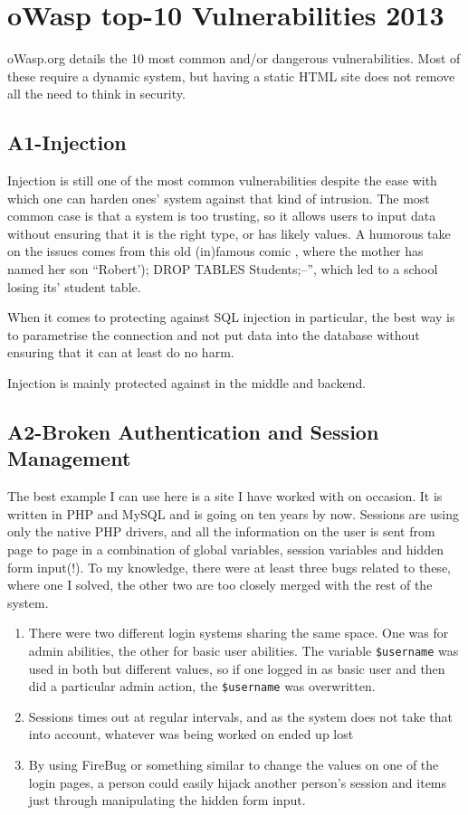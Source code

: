 \section{oWasp top-10 Vulnerabilities 2013}
\label{sec:owasp2013}
\noindent
oWasp.org \citep{oWasp2013t10} details the 10 most common and/or dangerous vulnerabilities. Most of these require a dynamic system, but having a static HTML site does not remove all the need to think in security.

\subsection{A1-Injection}
\noindent
Injection is still one of the most common vulnerabilities despite the ease with which one can harden ones' system against that kind of intrusion. The most common case is that a system is too trusting, so it allows users to input data without ensuring that it is the right type, or has likely values. A humorous take on the issues comes from this old (in)famous comic \citep{XKCDBobbyTables}, where the mother has named her son ``Robert'); DROP TABLES Students;--'', which led to a school losing its' student table.

When it comes to protecting against SQL injection in particular, the best way is to parametrise the connection and not put data into the database without ensuring that it can at least do no harm.

Injection is mainly protected against in the middle and backend.

\subsection{A2-Broken Authentication and Session Management}
\noindent
The best example I can use here is a site I have worked with on occasion. It is written in PHP and MySQL and is going on ten years by now. Sessions are using only the native PHP drivers, and all the information on the user is sent from page to page in a combination of global variables, session variables and hidden form input(!). To my knowledge, there were at least three bugs related to these, where one I solved, the other two are too closely merged with the rest of the system.

\begin{enumerate}
\item There were two different login systems sharing the same space. One was for admin abilities, the other for basic user abilities. The variable \texttt{\$username} was used in both but different values, so if one logged in as basic user and then did a particular admin action, the \texttt{\$username} was overwritten.
\item Sessions times out at regular intervals, and as the system does not take that into account, whatever was being worked on ended up lost
\item By using FireBug or something similar to change the values on one of the login pages, a person could easily hijack another person's session and items just through manipulating the hidden form input.
\end{enumerate}

